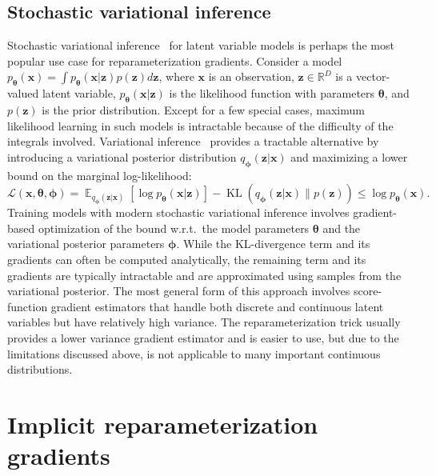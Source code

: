 \documentclass{article}
\DeclareMathOperator{\E}{\mathbb{E}}
\let\vec\bm
\newcommand{\wrt}{w.r.t.~}
\begin{document}
\subsection{Stochastic variational inference}

Stochastic variational inference~\cite{hoffman2013stochastic} for latent variable models is perhaps the most popular use case for reparameterization gradients. Consider a model $p_{\vec{\theta}} (\vec{x}) = \int p_{\vec{\theta}} (\vec{x} | \vec{z}) p(\vec{z}) d\vec{z}$, where $\vec{x}$ is an observation, $\vec{z} \in \mathbb{R}^D$ is a vector-valued latent variable, $p_{\vec{\theta}} (\vec{x}|\vec{z})$ is the likelihood function with parameters $\vec{\theta}$, and $p(\vec{z})$ is the prior distribution. Except for a few special cases, maximum likelihood learning in such models is intractable because of the difficulty of the integrals involved. Variational inference~\cite{jaakkola2000bayesian} provides a tractable alternative by introducing a variational posterior distribution $q_{\vec{\phi}} (\vec{z} | \vec{x})$ and maximizing a lower bound on the marginal log-likelihood:
\begin{equation}
    \mathcal{L}(\vec{x}, \vec{\theta}, \vec{\phi}) = \E_{q_{\vec{\phi}} (\vec{z} | \vec{x})} \left[ \log p_{\vec{\theta}} (\vec{x} | \vec{z})\right] - \operatorname{KL}(q_{\vec{\phi}} (\vec{z} | \vec{x}) \| p(\vec{z}) ) \leq \log p_{\vec{\theta}} (\vec{x}).
\end{equation}
Training models with modern stochastic variational inference \cite{paisley2012variational,kingma2014auto} involves gradient-based optimization of the bound \wrt the model parameters $\vec{\theta}$ and the variational posterior parameters $\vec{\phi}$. While the KL-divergence term and its gradients can often be computed analytically, the remaining term and its gradients are typically intractable and are approximated using samples from the variational posterior. The most general form of this approach involves score-function gradient estimators \cite{paisley2012variational,ranganath2014black,mnih2014neural} that handle both discrete and continuous latent variables but have relatively high variance. The reparameterization trick usually provides a lower variance gradient estimator and is easier to use, but due to the limitations discussed above, is not applicable to many important continuous distributions.

 
\section{Implicit reparameterization gradients}
\end{document}
